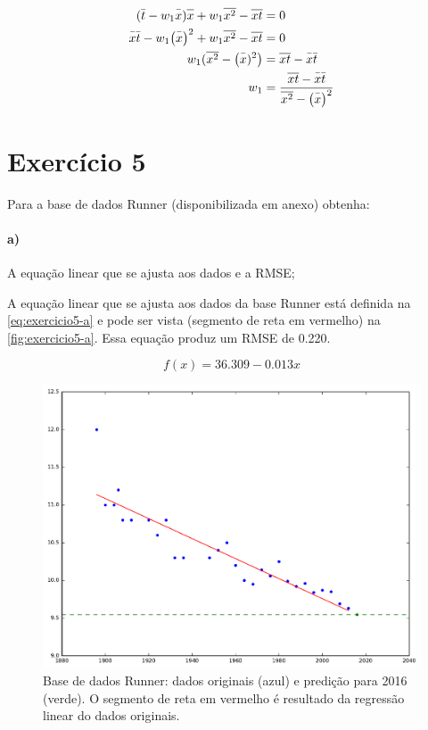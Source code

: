 \documentclass{article}
\newcommand{\media}[1]{\ensuremath{\bar{#1\vphantom{+1}}}}
\begin{document}
\begin{align*}
(\media{t} - w_1\media{x})\overline{x\vphantom{+1}} + w_1\overline{x^2\vphantom{+1}} - \overline{xt\vphantom{+1}} &= 0 \\
\media{x}\media{t} - w_1\big(\media{x}\big)^2 + w_1\overline{x^2\vphantom{+1}} - \overline{xt\vphantom{+1}} &= 0 \\
w_1(\overline{x^2\vphantom{+1}} - \big(\media{x})^2\big) &= \overline{xt\vphantom{+1}} - \media{x}\media{t} \\
w_1 &= \frac{\overline{xt\vphantom{+1}} - \media{x}\media{t}}{\overline{x^2\vphantom{+1}} - \big(\media{x}\big)^2} \\
\end{align*}

\section{Exercício 5}

Para a base de dados Runner (disponibilizada em anexo) obtenha:

\paragraph{a)} A equação linear que se ajusta aos dados e a RMSE;

A equação linear que se ajusta aos dados da base Runner está definida na \autoref{eq:exercicio5-a} e pode ser vista (segmento de reta em vermelho) na \autoref{fig:exercicio5-a}. Essa equação produz um RMSE de 0.220.

\begin{equation}
\label{eq:exercicio5-a}
	f(x) = 36.309 - 0.013x
\end{equation}

\begin{figure}[h]
	\centering
	\includegraphics[width=0.5\linewidth]{exercicio5-a.pdf}
	\caption{Base de dados Runner: dados originais (azul) e predição para 2016 (verde). O segmento de reta em vermelho é resultado da regressão linear do dados originais.}
	\label{fig:exercicio5-a}
\end{figure}
\end{document}
